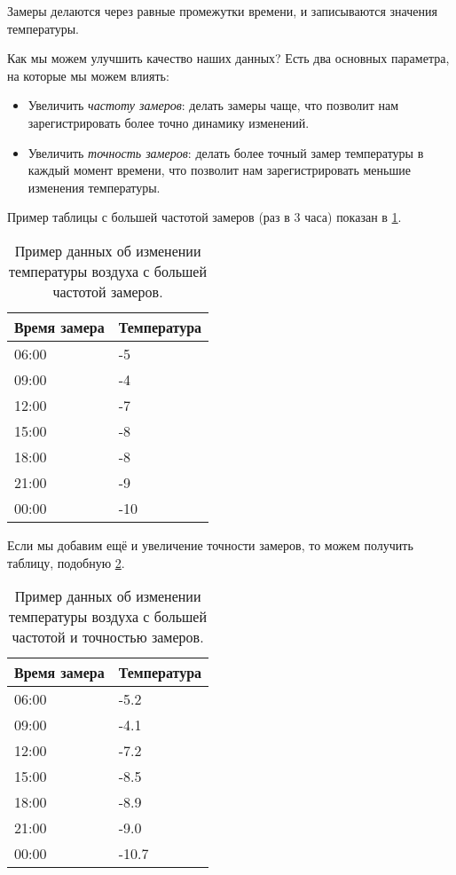 \documentclass[../sparc.tex]{subfiles}
\begin{document}
Замеры делаются через равные промежутки времени, и записываются значения
температуры.

Как мы можем улучшить качество наших данных?  Есть два основных параметра, на
которые мы можем влиять:

\begin{itemize}
\item Увеличить \emph{частоту замеров}: делать замеры чаще, что позволит нам
  зарегистрировать более точно динамику изменений.
\item Увеличить \emph{точность замеров}: делать более точный замер температуры в
  каждый момент времени, что позволит нам зарегистрировать меньшие изменения
  температуры.
\end{itemize}

Пример таблицы с большей частотой замеров (раз в 3 часа) показан в
\ref{table:adc-temperature-data-example-2}.

\begin{table}[h]
  \centering
  \begin{tabular}{p{3cm}|p{4cm}}
    Время замера & Температура \\
    \hline \hline
    06:00 & -5 \\
    \hline
    09:00 & -4 \\
    \hline
    12:00 & -7 \\
    \hline
    15:00 & -8 \\
    \hline
    18:00 & -8 \\
    \hline
    21:00 & -9 \\
    \hline
    00:00 & -10 \\
    \hline
  \end{tabular}
  \caption{Пример данных об изменении температуры воздуха с большей частотой
    замеров.}
  \label{table:adc-temperature-data-example-2}
\end{table}

Если мы добавим ещё и увеличение точности замеров, то можем получить таблицу,
подобную \ref{table:adc-temperature-data-example-3}.

\begin{table}[h]
  \centering
  \begin{tabular}{p{3cm}|p{4cm}}
    Время замера & Температура \\
    \hline \hline
    06:00 & -5.2 \\
    \hline
    09:00 & -4.1 \\
    \hline
    12:00 & -7.2 \\
    \hline
    15:00 & -8.5 \\
    \hline
    18:00 & -8.9 \\
    \hline
    21:00 & -9.0 \\
    \hline
    00:00 & -10.7 \\
    \hline
  \end{tabular}
  \caption{Пример данных об изменении температуры воздуха с большей частотой
    и точностью замеров.}
  \label{table:adc-temperature-data-example-3}
\end{table}
\end{document}
